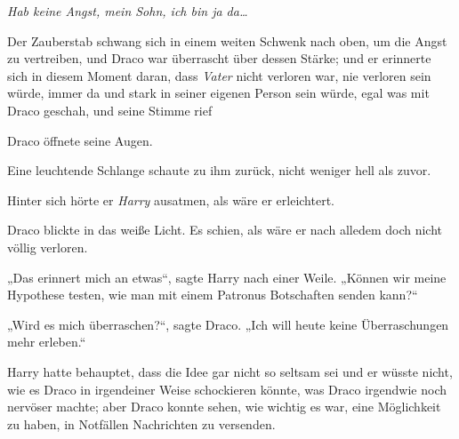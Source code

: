 \emph{Hab keine Angst, mein Sohn, ich bin ja da…}

Der Zauberstab schwang sich in einem weiten Schwenk nach oben, um die Angst zu vertreiben, und Draco war überrascht über dessen Stärke; und er erinnerte sich in diesem Moment daran, dass \emph{Vater} nicht verloren war, nie verloren sein würde, immer da und stark in seiner eigenen Person sein würde, egal was mit Draco geschah, und seine Stimme rief 

Draco öffnete seine Augen.

Eine leuchtende Schlange schaute zu ihm zurück, nicht weniger hell als zuvor.

Hinter sich hörte er \emph{Harry} ausatmen, als wäre er erleichtert.

Draco blickte in das weiße Licht. Es schien, als wäre er nach alledem doch nicht völlig verloren.

„Das erinnert mich an etwas“, sagte Harry nach einer Weile. „Können wir meine Hypothese testen, wie man mit einem Patronus Botschaften senden kann?“

„Wird es mich überraschen?“, sagte Draco. „Ich will heute keine Überraschungen mehr erleben.“

\later

Harry hatte behauptet, dass die Idee gar nicht so seltsam sei und er wüsste nicht, wie es Draco in irgendeiner Weise schockieren könnte, was Draco irgendwie noch nervöser machte; aber Draco konnte sehen, wie wichtig es war, eine Möglichkeit zu haben, in Notfällen Nachrichten zu versenden.

